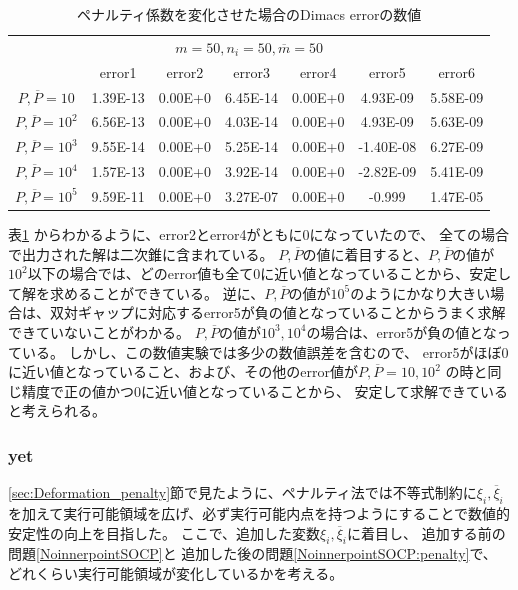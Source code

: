 \documentclass[11pt,a4paper,dvipdfmx,titlepage,uplatex]{jsarticle}
\theoremstyle{mystyle}
\newcommand{\0}{\mathbf{0}}
\begin{document}
\begin{table}[tp]
  \caption{ペナルティ係数を変化させた場合のDimacs errorの数値}
  \label{table:Experimental_Result_penalty_dimacserror}
  \centering
  \scriptsize
  \begin{tabular}{|c|c|c|c|c|c|c|}
    \cline{1-7}
    \multicolumn{7}{|c|}{$m = 50,n_i = 50,\overline{m}= 50$}\\
    \cline{1-7}
    & error1 & error2 & error3 & error4 & error5& error6 \\
    \cline{1-7}
    $P, \overline{P} = 10$ & 1.39E-13 & 0.00E+0 & 6.45E-14 & 0.00E+0 & 4.93E-09 & 5.58E-09 \\
    \cline{1-7}
    $P, \overline{P} = 10^2$ & 6.56E-13 & 0.00E+0 & 4.03E-14 & 0.00E+0 & 4.93E-09 & 5.63E-09 \\
    \cline{1-7}
    $P, \overline{P} = 10^3$  & 9.55E-14 & 0.00E+0 & 5.25E-14 & 0.00E+0 & -1.40E-08 & 6.27E-09 \\
    \cline{1-7}
    $P, \overline{P} = 10^4$  & 1.57E-13 & 0.00E+0 & 3.92E-14 & 0.00E+0 & -2.82E-09 & 5.41E-09 \\
    \cline{1-7}
    $P, \overline{P} = 10^5$  & 9.59E-11 & 0.00E+0 & 3.27E-07 & 0.00E+0 & -0.999 & 1.47E-05 \\
    \cline{1-7}
  \end{tabular}
\end{table}

表\ref{table:Experimental_Result_penalty_dimacserror}
からわかるように、error2とerror4がともに0になっていたので、
全ての場合で出力された解は二次錐に含まれている。
$P, \overline{P}$の値に着目すると、$P, \overline{P}$の値が$10^2$以下の場合では、どのerror値も全て0に近い値となっていることから、安定して解を求めることができている。
逆に、$P, \overline{P}$の値が$10^5$のようにかなり大きい場合は、双対ギャップに対応するerror5が負の値となっていることからうまく求解できていないことがわかる。
$P, \overline{P}$の値が$10^3,10^4$の場合は、error5が負の値となっている。
しかし、この数値実験では多少の数値誤差を含むので、
error5がほぼ0に近い値となっていること、および、その他のerror値が$P, \overline{P} = 10,10^2$
の時と同じ精度で正の値かつ0に近い値となっていることから、
安定して求解できていると考えられる。

\subsubsection{yet}
\ref{sec:Deformation_penalty}節で見たように、ペナルティ法では不等式制約に$\xi_i,\overline{\xi}_i$を加えて実行可能領域を広げ、必ず実行可能内点を持つようにすることで数値的安定性の向上を目指した。
ここで、追加した変数$\xi_i,\overline{\xi}_i$に着目し、
追加する前の問題\eqref{NoinnerpointSOCP}と
追加した後の問題\eqref{NoinnerpointSOCP:penalty}で、
どれくらい実行可能領域が変化しているかを考える。
\end{document}
